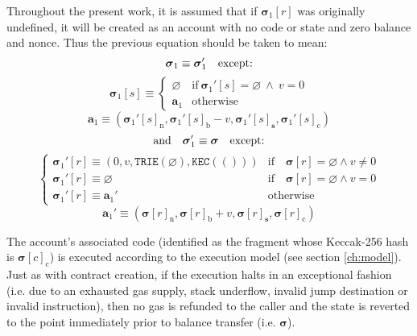 \documentclass[9pt,oneside]{amsart}
\begin{document}
\begin{multicols}{2}
Throughout the present work, it is assumed that if $\boldsymbol{\sigma}_1[r]$ was originally undefined, it will be created as an account with no code or state and zero balance and nonce. Thus the previous equation should be taken to mean:
\begin{equation}
\boldsymbol{\sigma}_1 \equiv \boldsymbol{\sigma}_1' \quad \text{except:} \\
\end{equation}
\begin{equation}
\boldsymbol{\sigma}_1[s] \equiv \begin{cases}
\varnothing & \text{if}\ \boldsymbol{\sigma}_1'[s] = \varnothing \ \wedge\ v = 0 \\
\mathbf{a}_1 &\text{otherwise}
\end{cases}
\end{equation}
\begin{equation}
\mathbf{a}_1 \equiv \left(\boldsymbol{\sigma}_1'[s]_{\mathrm{n}}, \boldsymbol{\sigma}_1'[s]_{\mathrm{b}} - v, \boldsymbol{\sigma}_1'[s]_{\mathbf{s}}, \boldsymbol{\sigma}_1'[s]_{\mathrm{c}}\right)
\end{equation}
\begin{equation}
\text{and}\quad \boldsymbol{\sigma}_1' \equiv \boldsymbol{\sigma} \quad \text{except:} \\
\end{equation}
\begin{equation}
\begin{cases}
\boldsymbol{\sigma}_1'[r] \equiv (0, v, \mathtt{TRIE}(\varnothing), \mathtt{KEC}(())) & \text{if} \quad \boldsymbol{\sigma}[r] = \varnothing \wedge v \neq 0 \\
\boldsymbol{\sigma}_1'[r] \equiv \varnothing & \text{if}\quad \boldsymbol{\sigma}[r] = \varnothing \wedge v = 0 \\
\boldsymbol{\sigma}_1'[r] \equiv \mathbf{a}_1' & \text{otherwise}
\end{cases}
\end{equation}
\begin{equation}
\mathbf{a}_1' \equiv (\boldsymbol{\sigma}[r]_{\mathrm{n}}, \boldsymbol{\sigma}[r]_{\mathrm{b}} + v, \boldsymbol{\sigma}[r]_{\mathbf{s}}, \boldsymbol{\sigma}[r]_{\mathrm{c}})
\end{equation}

The account's associated code (identified as the fragment whose Keccak-256 hash is $\boldsymbol{\sigma}[c]_{\mathrm{c}}$) is executed according to the execution model (see section \ref{ch:model}). Just as with contract creation, if the execution halts in an exceptional fashion (i.e. due to an exhausted gas supply, stack underflow, invalid jump destination or invalid instruction), then no gas is refunded to the caller and the state is reverted to the point immediately prior to balance transfer (i.e. $\boldsymbol{\sigma}$).


\end{multicols}
\end{document}
